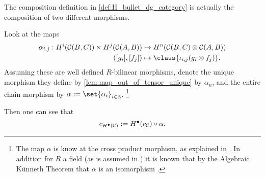 \begin{remark}
    \label{rem:H_bullet_composition_alpha}
    The composition definition in \autoref{def:H_bullet_dg_category} is actually the composition of two different morphisms.

    Look at the maps
    \begin{align*}
        \alpha_{i, j}: H^i(\Cc(B, C)) \times H^j(\Cc(A, B)) &\to H^n(\Cc(B, C) \otimes \Cc(A, B)) \\
        ([g_i], [f_j]) &\mapsto \class{\iota_{i, j}(g_i \otimes f_j)}.
    \end{align*}
    Assuming these are well defined \( R \)-bilinear morphisms, denote the unique morphism they define by \autoref{lem:map_out_of_tensor_unique} by \( \alpha_n \), and the entire chain morphism by \( \alpha := \set{\alpha_i}_{i \in \Zb} \). \footnote{
        The map \( \alpha \) is know at the cross product morphism, as explained in \cite[p. 273]{Hatcher}. In addition for \( R \) a field (as is assumed in \cite{Jasso-Muro_2023}) it is known that by the Algebraic Künneth Theorem that \( \alpha \) is an isomorphism \cite[Theorem 3B.5]{Hatcher}.
    }
    
    Then one can see that
    \[
        c_{H^\bullet({\mathcal{C}})} := H^\bullet(c_{{\mathcal{C}}}) \circ \alpha.
    \] 
\end{remark}
